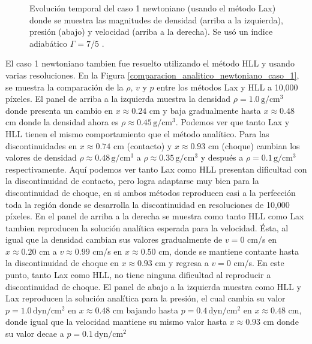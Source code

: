 \documentclass[12pt,a4paper]{book}
\begin{document}
\begin{figure}
      \caption{\label{caso_new_rar_shock} Evolución temporal del caso 1 newtoniano (usando el método Lax) donde se muestra
      las magnitudes de densidad (arriba a la izquierda), presión (abajo) y 
      velocidad (arriba a la derecha). 
      Se usó un índice adiabático $\Gamma = 7/5$ .}
  \end{figure}

  El caso 1 newtoniano tambien fue resuelto utilizando el método HLL y usando varias resoluciones. 
  En la Figura 
  \ref{comparacion_analitico_newtoniano_caso_1}, se muestra la comparación de la $\rho, \, v$ y $p$
  entre los métodos Lax 
  y HLL a 10,000 píxeles. 
  El panel de arriba a la izquierda muestra la densidad $\rho = 1.0 \,  \text{g}/ \text{cm}^3$ 
  donde presenta un cambio en 
  $x \approx 0.24 $ cm y baja gradualmente hasta $x \approx 0.48$ cm donde la densidad ahora es $\rho \approx
  0.45 \,  \text{g}/ \text{cm}^3$.  Podemos ver que tanto Lax y HLL tienen el 
  mismo comportamiento
  que el método analítico. 
  Para las discontinuidades en $x \approx 0.74$ cm (contacto) y $x \approx 0.93$ cm (choque) cambian los valores de densidad $
  \rho \approx 0.48 \,  \text{g}/ \text{cm}^3$ a $\rho \approx 0.35 \,  \text{g}/ \text{cm}^3$ y 
  después a $\rho =0.1 \,  \text{g}/ \text{cm}^3$ 
  respectivamente. Aquí podemos ver
  tanto Lax como HLL presentan dificultad con la discontinuidad de contacto, 
  pero logra adaptarse muy bien para la discontinuidad de choque, en si ambos métodos reproducen 
  casi a 
  la perfección toda la región donde se desarrolla la discontinuidad en resoluciones de 10,000 píxeles.
  En el panel de arriba a la derecha se muestra como tanto HLL como Lax tambien reproducen la 
  solución analítica esperada para
  la velocidad. Ésta, al igual que la densidad cambian 
  sus valores gradualmente de $v = 0$ cm/s en $x \approx 0.20$ cm a $v \approx 0.99$ cm/s en 
  $x \approx 0.50$ cm,
  donde se mantiene contante hasta la discontinuidad de choque en $x \approx 0.93$ cm y regresa a $v = 0$ cm/s.
  En este punto, tanto Lax como HLL, no tiene ninguna dificultad al reproducir a discontinuidad de 
  choque.
  El panel de abajo a la izquierda muestra como HLL y Lax reproducen la solución 
  analítica para
  la presión, el cual cambia su valor 
  $p = 1.0 \,  \text{dyn}/ \text{cm}^2 $ en $x \approx 0.48$ cm
  bajando hasta $p = 0.4 \,  \text{dyn}/ \text{cm}^2 $ en $x \approx 0.48$ cm, 
  donde igual que la velocidad
  mantiene su mismo valor hasta $x \approx 0.93$ cm donde su valor decae a $p = 0.1 \,  \text{dyn}/ \text{cm}^2 $
\end{document}
